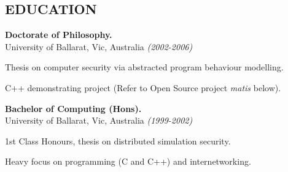 \documentclass[margin]{res}
\begin{document}
\begin{resume}





\section{EDUCATION}

{\bf Doctorate of Philosophy.} \\
University of Ballarat, Vic, Australia {\em (2002-2006)}
\begin{list}{}{\leftmargin=1.5em \topsep=5pt \partopsep=0pt \parsep=2.5pt}
  \item Thesis on computer security via abstracted program behaviour modelling.
  \item C++ demonstrating project (Refer to Open Source project {\em
    matis} below).
\end{list}

{\bf Bachelor of Computing (Hons).} \\
University of Ballarat, Vic, Australia {\em (1999-2002)}
\begin{list}{}{\leftmargin=1.5em \topsep=5pt \partopsep=0pt \parsep=2.5pt}
  \item 1st Class Honours, thesis on distributed simulation security.
  \item Heavy focus on programming (C and C++) and internetworking.
\end{list}



\end{resume}
\end{document}
